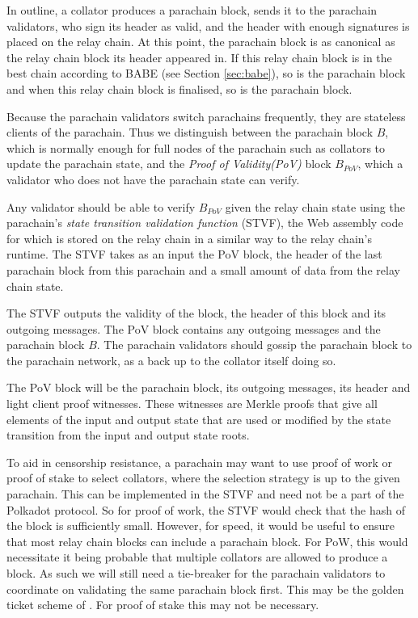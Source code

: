 \documentclass{article}
\begin{document}
In outline, a collator produces a parachain block, sends it to the parachain validators,
who sign its header as valid, and the header with enough signatures is placed on the relay chain.
At this point, the parachain block is as canonical as the relay chain block its header appeared in.
If this relay chain block is in the best chain according to BABE (see Section \ref{sec:babe}), so is the parachain block and when this relay chain block is finalised, so is the parachain block.

Because the parachain validators switch parachains frequently, they are stateless clients of the parachain.
Thus we distinguish between the parachain block $B$, which is normally enough for full nodes of the parachain such as collators to update the parachain state,
and the {\em Proof of Validity(PoV)} block $B_{PoV}$, which a validator who does not have the parachain state can verify.

Any validator should be able to verify $B_{PoV}$ given the relay chain state using the parachain's {\em state transition validation function} (STVF),
the Web assembly code for which is stored on the relay chain in a similar way to the relay chain's runtime.
The STVF takes as an input the PoV block, the header of the last parachain block from this parachain and a small amount of data from the relay chain state.

The STVF outputs the validity of the block, the header of this block and its outgoing messages.
The PoV block contains any outgoing messages and the parachain block $B$. The parachain validators should gossip the parachain block to the parachain network, as a back up to the collator itself doing so.

The PoV block will be the parachain block, its outgoing messages, its header and light client proof witnesses. These witnesses are Merkle proofs that give all elements of the input and output state that are used or modified by the state transition from the input and output state roots.


To aid in censorship resistance, a parachain may want to use proof of work or proof of stake to select collators, where the selection strategy is up to the given parachain.
This can be implemented in the STVF and need not be a part of the Polkadot protocol. So for proof of work,
the STVF would check that the hash of the block is sufficiently small.
However, for speed, it would be useful to ensure that most relay chain blocks can include a parachain block.
For PoW, this would necessitate it being probable that multiple collators are allowed to produce a block.
As such we will still need a tie-breaker for the parachain validators to coordinate on validating the same parachain block first.
This may be the golden ticket scheme of \cite{2016:Wood:Polkadot}. For proof of stake this may not be necessary.
\end{document}
